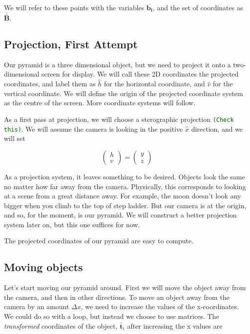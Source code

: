 \documentclass[12pt]{article}
\newcommand{\chk}{ \textcolor{darkgreen}{{\tt (Check this)}}}
\renewcommand{\vec}[1]{\ensuremath{\mathbf{\bar{#1}}}}
\newcommand{\mat}[1]{\ensuremath{\mathbf{\bar{\bar{#1}}}}}
\begin{document}
We will refer to these points with the variables \vec{b_i}, and the set of coordinates as \mat{B}.

\subsection{Projection, First Attempt}
Our pyramid is a three dimensional object, but we need to project it onto a two-dimensional screen for display. We will call these 2D coordinates the projected coordinates, and label them as $\hat{h}$ for the horizontal coordinate, and $\hat{v}$ for the vertical coordinate. We will define the origin of the projected coordinate system as the centre of the screen. More coordinate systems will follow. 

As a first pass at projection, we will choose a sterographic projection\chk. We will assume the camera is looking in the positive $\hat{x}$ direction, and we will set 

$$
\begin{pmatrix}h \\v \end{pmatrix} = 
\begin{pmatrix}y \\ z \end{pmatrix} 
$$

As a projection system, it leaves something to be desired. Objects look the same no matter how far away from the camera. Physically, this corresponds to looking at a scene from a great distance away. For example, the moon doesn't look any bigger when you climb to the top of step ladder. But our camera is at the origin, and so, for the moment, is our pyramid. We will construct a better projection system later on, but this one suffices for now.

The projected coordinates of our pyramid are easy to compute.



\subsection{Moving objects}
Let's start moving our pyramid around. First we will move the object away from the camera, and then in other directions. To move an object away from the camera by an amount $\Delta x$, we need to increase the values of the x-coordinates. We could do so with a loop, but instead we choose to use matrices. The {\it transformed} coordinates of  the object, \vec{t}$_i$ after increasing the x values are 
\end{document}
